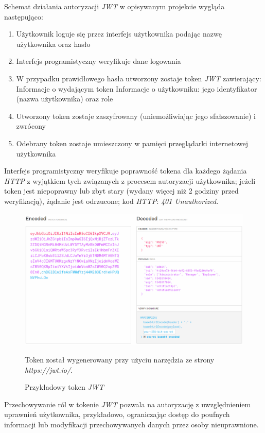 \documentclass[eng,printmode,openany]{mgr}
\begin{document}
	Schemat działania autoryzacji \textit{JWT} w opisywanym projekcie wygląda następująco:
	\begin{enumerate}
		\item Użytkownik loguje się przez interfejs użytkownika podając nazwę użytkownika oraz hasło
		\item Interfejs programistyczny weryfikuje dane logowania
		\item W przypadku prawidłowego hasła utworzony zostaje token \textit{JWT} zawierający:
		\subitem Informacje o wydającym token
		\subitem Informacje o użytkowniku: jego identyfikator (nazwa użytkownika) oraz role
		\item Utworzony token zostaje zaszyfrowany (uniemożliwiając jego sfałszowanie) i zwrócony
		\item Odebrany token zostaje umieszczony w pamięci przeglądarki internetowej użytkownika
	\end{enumerate}
	Interfejs programistyczny weryfikuje poprawność tokena dla każdego żądania \textit{HTTP} z wyjątkiem tych związanych z procesem autoryzacji użytkownika; jeżeli token jest niepoprawny lub zbyt stary (wydany więcej niż 2 godziny przed weryfikacją), żądanie jest odrzucone; kod \textit{HTTP}: \textit{401 Unauthorized}.
	
	\begin{figure}[H]
		\centering
		\includegraphics[width=\textwidth]{images/jwt.png}
		\caption{Przykładowy token \textit{JWT}}
		\small
		Token został wygenerowany przy użyciu narzędzia ze strony \textit{https://jwt.io/}.
	\end{figure}
	
	Przechowywanie ról w tokenie \textit{JWT} pozwala na autoryzację z uwzględnieniem uprawnień użytkownika, przykładowo, ograniczając dostęp do poufnych informacji lub modyfikacji przechowywanych danych przez osoby nieuprawnione.
	
\end{document}
